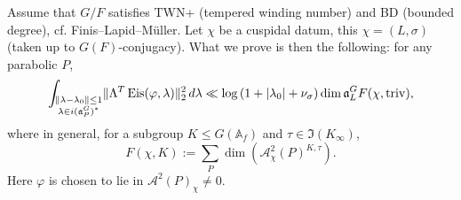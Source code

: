 \documentclass[reqno]{amsart} 
\begin{document}
\begin{theorem}[J--Kamber 2022+]
  Assume that $G/F$ satisfies TWN+ (tempered winding number) and BD (bounded degree), cf. Finis--Lapid--M{\"u}ller.  Let $\chi$ be a cuspidal datum, this $\chi = (L, \sigma)$ (taken up to $G(F)$-conjugacy).  What we prove is then the following: for any parabolic $P$,
  \begin{equation*}
    \int_{
      \substack{
        \lVert \lambda - \lambda_0  \rVert \leq 1  \\
         \lambda \in i (\mathfrak{a}_P^G )^\ast 
      }
    }
    \lVert \Lambda^T \operatorname{Eis} (\varphi, \lambda ) \rVert_2^2 \, d \lambda
    \ll
    \log \left( 1 + \lvert \lambda_0  \rvert + \nu_\sigma \right) \dim \mathfrak{a}_L^G F (\chi, \mathrm{triv}),
  \end{equation*}
  where in general, for a subgroup $K \leq G (\mathbb{A}_f )$ and $\tau \in \Im (K _\infty )$,
  \begin{equation*}
    F (\chi, K)
    :=
    \sum_{P}
    \dim \left( \mathcal{A}_\chi^2 (P)^{K, \tau } \right).
  \end{equation*}
  Here $\varphi $ is chosen to lie in $\mathcal{A}^2 (P)_\chi \neq 0$.
\end{theorem}
\end{document}
